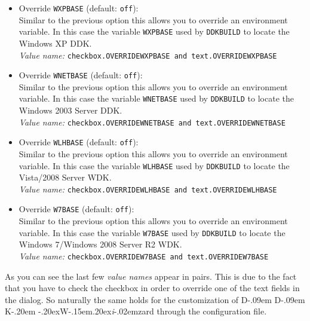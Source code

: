 \documentclass[a4paper,titlepage]{report}
\newcommand{\default}[1]{\textcolor[gray]{0.40}{(default: \texttt{#1})}}
\newcommand{\option}[1]{\textcolor[rgb]{0.00,0.20,0.20}{\textsf{#1}}}
\newcommand{\optiondeco}[1]{#1\vspace{0.1cm}}
\newcommand{\inioption}[1]{\\\textcolor[rgb]{0.00,0.00,0.40}{\textsl{Value name:} \texttt{#1}}}
\def\ddkwiz{\texorpdfstring{D\kern-.09em D\kern-.09em K\kern-.20em \raise-.20ex\hbox{W}\kern-.15em\raise.20ex\hbox{\it{i}}\kern-.02em{zard}}{DDKWizard}}
\begin{document}
\begin{itemize}
  Enabling this option, you can override the value of the environment variable
  \texttt{DDKBUILD\_PATH} for the created projects. This allows you for example
  to customize \texttt{DDKBUILD} and point the projects to your own version of
  \texttt{DDKBUILD}\footnote{\ddkwiz{} still makes the assumption that the
  options are compatible with OSRs \texttt{DDKBUILD} versions.}.\\
  Note that you have to give the full path including the filename of your
  \texttt{DDKBUILD} script.
  \inioption{checkbox.OVERRIDEDDKBUILD \textrm{and} text.OVERRIDEDDKBUILD}
  \item \optiondeco{\option{Override \texttt{WXPBASE}} \default{off}:}\\
  Similar to the previous option this allows you to override an environment
  variable.
  In this case the variable \texttt{WXPBASE} used by \texttt{DDKBUILD} to
  locate the Windows XP DDK.
  \inioption{checkbox.OVERRIDEWXPBASE \textrm{and} text.OVERRIDEWXPBASE}
  \item \optiondeco{\option{Override \texttt{WNETBASE}} \default{off}:}\\
  Similar to the previous option this allows you to override an environment
  variable.
  In this case the variable \texttt{WNETBASE} used by \texttt{DDKBUILD} to
  locate the Windows 2003 Server DDK.
  \inioption{checkbox.OVERRIDEWNETBASE \textrm{and} text.OVERRIDEWNETBASE}
  \item \optiondeco{\option{Override \texttt{WLHBASE}} \default{off}:}\\
  Similar to the previous option this allows you to override an environment
  variable.
  In this case the variable \texttt{WLHBASE} used by \texttt{DDKBUILD} to
  locate the Vista/2008 Server WDK.
  \inioption{checkbox.OVERRIDEWLHBASE \textrm{and} text.OVERRIDEWLHBASE}
  \item \optiondeco{\option{Override \texttt{W7BASE}} \default{off}:}\\
  Similar to the previous option this allows you to override an environment
  variable.
  In this case the variable \texttt{W7BASE} used by \texttt{DDKBUILD} to
  locate the Windows 7/Windows 2008 Server R2 WDK.
  \inioption{checkbox.OVERRIDEW7BASE \textrm{and} text.OVERRIDEW7BASE}
\end{itemize}

As you can see the last few \emph{value names} appear in pairs. This is due to the
fact that you have to check the checkbox in order to override one of the
text fields in the dialog. So naturally the same holds for the customization
of \ddkwiz{} through the configuration file.
\end{document}
